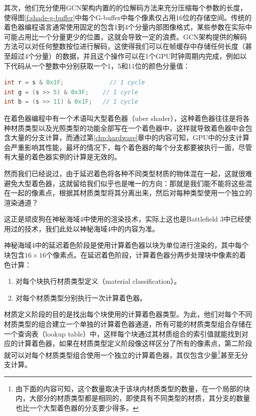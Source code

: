 其次，他们充分使用GCN架构内置的的位解码方法来充分压缩每个参数的长度，使得图\ref{f:shade-g-buffer}中每个G-buffer中每个像素仅占用16位的存储空间。传统的着色器编程语言通常使用固定的包含1到4个分量内部图像格式，某些参数在实际中可能占用比一个分量更少的位置，这就会导致一定的浪费。GCN架构提供的解码方法\cite{a:Low-levelShaderOptimizationforNext-GenandDX11}可以对任何整数按位进行解码，这使得我们可以在帧缓存中存储任何长度（甚至超过4个分量）的数据，并且这个操作可以在1个GPU时钟周期内完成，例如以下代码从一个整数中分别获取一个1，5和11位的颜色分量值：

\begin{lstlisting}[language=C++]
int r = s & 0x1F; 			  // 1 cycle
int g = (s >> 5) & 0x3F;	// 1 cycle
int b = (s >> 11) & 0x1F;	// 1 cycle
\end{lstlisting}

在着色器编程中有一个术语叫大型着色器（uber shader），这种着色器往往是将各种材质类型以及光照类型的功能全部写在一个着色器中，这样就导致着色器中会包含大量的分支计算，而通过第\ref{chp:hardware}章中的内容可知，GPU中的分支计算会严重影响其性能，最坏的情况下，每个着色器的每个分支都要被执行一面，尽管有大量的着色器实例的计算是无效的。

然而我们已经说过，由于延迟着色将各种不同类型材质的物体混在一起，这就很难避免大型着色器，这就留给我们似乎也是唯一的方向：那就是我们能不能将这些混在一起的像素点，根据其材质类型将其分离出来，然后对每种类型使用一个独立的渲染通道？

这正是顽皮狗在神秘海域4\cite{a:DeferredLightinginUncharted4}中使用的渲染技术，实际上这也是Battlefield 3\cite{a:SPU-basedDeferredShadingforBattlefield3onPlaystation3}中已经使用过的技术，我们此处以神秘海域4中的内容为准。

神秘海域4中的延迟着色阶段是使用计算着色器以块为单位进行渲染的，其中每个块包含$16\times 16$个像素点。在延迟着色阶段，计算着色器分两步处理块中像素的着色计算：

\begin{enumerate}
	\item 对每个块执行材质类型定义（material classification）。
	\item 对每个材质类型分别执行一次计算着色器。
\end{enumerate}

材质定义阶段的目的是找出每个块使用的计算着色器类型。为此，他们对每个不同材质类型的组合建立一个单独的计算着色器通道，所有可能的材质类型组合存储在一个查询表（lookup table）中，这样每个块通过其材质组合的索引值就能找到对应的计算着色器，如果在材质类型定义阶段像这样区分了所有的像素点，第二阶段就可以对每个材质类型组合使用一个独立的计算着色器，其仅包含少量\footnote{由下面的内容可知，这个数量取决于该块内材质类型的数量，在一个局部的块内，大部分的材质类型都是相同的，即使具有不同类型的材质，其分支的数量也比一个大型着色器的分支要少得多。}甚至无分支计算。

